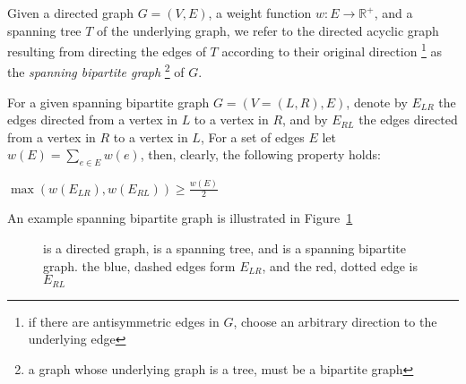 Given a directed graph $G = (V, E)$,
a weight function $w : E \rightarrow \mathbb{R^+}$, 
and a spanning tree $T$ of the underlying graph, 
we refer to the directed acyclic graph resulting from directing the edges 
of $T$ according to their original direction
\footnote{if there are antisymmetric edges in $G$, 
choose an arbitrary direction to the underlying edge}
as the \emph{spanning bipartite graph}
\footnote{a graph whose underlying graph is a tree, must be a bipartite graph}
of $G$.

For a given spanning bipartite graph $G = (V = (L, R), E)$, 
denote by $E_{LR}$ the edges directed from a vertex in $L$ to a vertex in $R$,
and by $E_{RL}$ the edges directed from a vertex in $R$ to a vertex in $L$,
For a set of edges $E$ let $w(E) = \sum_{e \in E}{w(e)}$, 
then, clearly, the following property holds:

\begin{observation}
\label{ob:geq_half}
$ \max(w(E_{LR}), w(E_{RL}))  \geq \frac{w(E)}{2} $
\end{observation}

An example spanning bipartite graph is illustrated in 
Figure~\ref{fig:spanning-bipartite-graph}

\begin{figure}
\centering

\caption{
\label{fig:spanning-bipartite-graph}
 is a directed graph, 
 is a spanning tree, and  
 is a spanning bipartite graph.
the blue, dashed edges form $E_{LR}$, 
and the red, dotted edge is $E_{RL}$  
}
\end{figure}